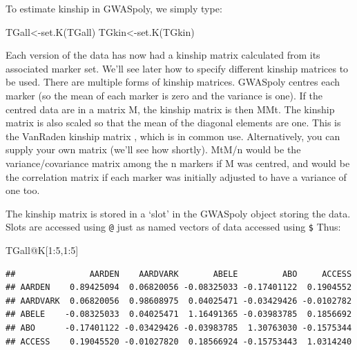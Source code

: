 \documentclass[
]{book}
\newenvironment{Shaded}{\begin{snugshade}}{\end{snugshade}}
\newcommand{\DecValTok}[1]{\textcolor[rgb]{0.00,0.00,0.81}{#1}}
\newcommand{\FunctionTok}[1]{\textcolor[rgb]{0.00,0.00,0.00}{#1}}
\newcommand{\NormalTok}[1]{#1}
\newcommand{\OtherTok}[1]{\textcolor[rgb]{0.56,0.35,0.01}{#1}}
\newcommand{\SpecialCharTok}[1]{\textcolor[rgb]{0.00,0.00,0.00}{#1}}
\begin{document}
To estimate kinship in GWASpoly, we simply type:

\begin{Shaded}
\begin{Highlighting}[]
\NormalTok{TGall}\OtherTok{\textless{}{-}}\FunctionTok{set.K}\NormalTok{(TGall)  }
\NormalTok{TGkin}\OtherTok{\textless{}{-}}\FunctionTok{set.K}\NormalTok{(TGkin) }
\end{Highlighting}
\end{Shaded}

Each version of the data has now had a kinship matrix calculated from its associated marker set. We'll see later how to specify different kinship matrices to be used. There are multiple forms of kinship matrices. GWASpoly centres each marker (so the mean of each marker is zero and the variance is one). If the centred data are in a matrix M, the kinship matrix is then MMt. The kinship matrix is also scaled so that the mean of the diagonal elements are one. This is the VanRaden kinship matrix \citep{vanraden_efficient_2008}, which is in common use. Alternatively, you can supply your own matrix (we'll see how shortly). MtM/n would be the variance/covariance matrix among the n markers if M was centred, and would be the correlation matrix if each marker was initially adjusted to have a variance of one too.

The kinship matrix is stored in a `slot' in the GWASpoly object storing the data. Slots are accessed using \texttt{@} just as named vectors of data accessed using \texttt{\$} Thus:

\begin{Shaded}
\begin{Highlighting}[]
\NormalTok{TGall}\SpecialCharTok{@}\NormalTok{K[}\DecValTok{1}\SpecialCharTok{:}\DecValTok{5}\NormalTok{,}\DecValTok{1}\SpecialCharTok{:}\DecValTok{5}\NormalTok{]}
\end{Highlighting}
\end{Shaded}

\begin{verbatim}
##               AARDEN    AARDVARK       ABELE         ABO     ACCESS
## AARDEN    0.89425094  0.06820056 -0.08325033 -0.17401122  0.1904552
## AARDVARK  0.06820056  0.98608975  0.04025471 -0.03429426 -0.0102782
## ABELE    -0.08325033  0.04025471  1.16491365 -0.03983785  0.1856692
## ABO      -0.17401122 -0.03429426 -0.03983785  1.30763030 -0.1575344
## ACCESS    0.19045520 -0.01027820  0.18566924 -0.15753443  1.0314240
\end{verbatim}
\end{document}
